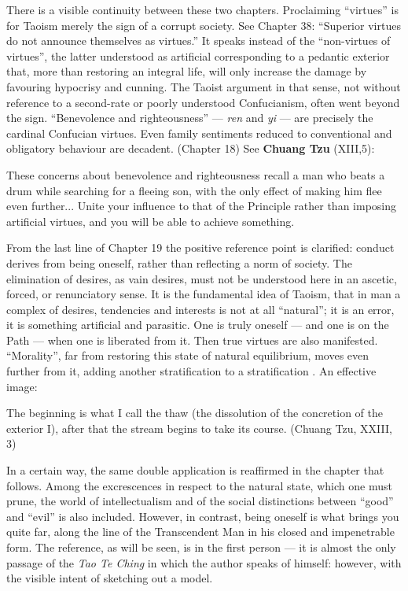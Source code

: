 There is a visible continuity between these two chapters. Proclaiming ``virtues'' is for Taoism merely the sign of a corrupt society. See Chapter 38: ``Superior virtues do not announce themselves as virtues.'' It speaks instead of the ``non-virtues of virtues'', the latter understood as artificial corresponding to a pedantic exterior that, more than restoring an integral life, will only increase the damage by favouring hypocrisy and cunning. The Taoist argument in that sense, not without reference to a second-rate or poorly understood Confucianism, often went beyond the sign. ``Benevolence and righteousness'' --- \emph{ren} and \emph{yi} --- are precisely the cardinal Confucian virtues. Even family sentiments reduced to conventional and obligatory behaviour are decadent. (Chapter 18) See \textbf{Chuang Tzu} (XIII,5):

\begin{quotex}
These concerns about benevolence and righteousness recall a man who beats a drum while searching for a fleeing son, with the only effect of making him flee even further... Unite your influence to that of the Principle rather than imposing artificial virtues, and you will be able to achieve something.
\end{quotex}


From the last line of Chapter 19 the positive reference point is clarified: conduct derives from being oneself, rather than reflecting a norm of society. The elimination of desires, as vain desires, must not be understood here in an ascetic, forced, or renunciatory sense. It is the fundamental idea of Taoism, that in man a complex of desires, tendencies and interests is not at all ``natural''; it is an error, it is something artificial and parasitic. One is truly oneself --- and one is on the Path --- when one is liberated from it. Then true virtues are also manifested. ``Morality'', far from restoring this state of natural equilibrium, moves even further from it, adding another stratification to a stratification . An effective image:

\begin{quotex}
The beginning is what I call the thaw (the dissolution of the concretion of the exterior I), after that the stream begins to take its course. (Chuang Tzu, XXIII, 3)
\end{quotex}


In a certain way, the same double application is reaffirmed in the chapter that follows. Among the excrescences in respect to the natural state, which one must prune, the world of intellectualism and of the social distinctions between ``good'' and ``evil'' is also included. However, in contrast, being oneself is what brings you quite far, along the line of the Transcendent Man in his closed and impenetrable form. The reference, as will be seen, is in the first person --- it is almost the only passage of the \emph{Tao Te Ching} in which the author speaks of himself: however, with the visible intent of sketching out a model.

